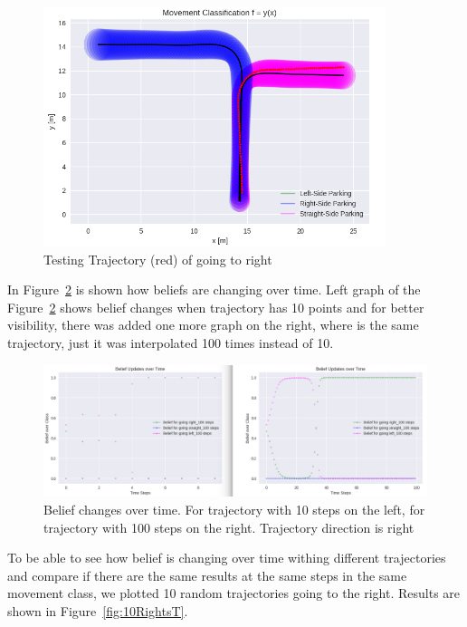 \begin{figure}[h]
	\centering  	
	\includegraphics[width=10cm]{img/right_org_T.jpg}
	\caption{Testing Trajectory (red) of going to right}
	\label{fig:right_T}    
\end{figure}

In Figure~\ref{fig:CompareRightT} is shown how beliefs are changing over time. Left graph of the Figure~\ref{fig:CompareRightT} shows belief changes when trajectory has 10 points and for better visibility, there was added one more graph on the right, where is the same trajectory, just it was interpolated 100 times instead of 10.

\begin{figure}[h]
	\centering  	
	\includegraphics[width=15cm]{img/10_100_compared_right_T.jpg}
	\caption{Belief changes over time. For trajectory with 10 steps on the left, for trajectory with 100 steps on the right. Trajectory direction is right}
	\label{fig:CompareRightT}    
\end{figure}

To be able to see how belief is changing over time withing different trajectories and compare if there are the same results at the same steps in the same movement class, we plotted 10 random trajectories going to the right. Results are shown in Figure~\ref{fig:10RightsT}.

